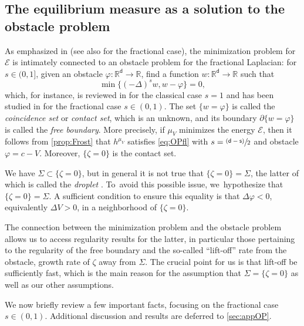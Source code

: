 \documentclass[10pt]{amsart}
\newcommand{\psfrac}[2]{\sfrac{(#1)}{#2}}
\theoremstyle{plain}
\theoremstyle{definition}
\newcommand{\R}{{\mathbb{R}}}
\newcommand{\Ec}{\mathcal{E}}
\let\D\Delta
\let\p\partial
\renewcommand{\d}{\mathsf{d}}
\newcommand{\s}{\mathsf{s}}
\begin{document}
\subsection{The equilibrium measure as a solution to the obstacle problem}\label{ssec:EMOPop}

As {emphasized} in \cite[\S 2.5]{Serfaty2015CGL} (see also \cite{PS2017,CDM2016} for the fractional case), the minimization problem for $\Ec$ is intimately connected to an obstacle problem for the fractional Laplacian: for $s\in (0,1]$, given an obstacle $\varphi:\R^\d\to\R$, find a function $w:\R^\d\to\R$ such that
\begin{equation}\label{eq:OPfl}
\min\{(-\D)^{s}w, w-\varphi\} = 0,
\end{equation}
which, for instance, is reviewed in \cite{Caffarelli1998} for the classical case $s=1$ and has been studied in \cite{Silvestre2007,ACS2008, CSS2008, KPS2015, DsS2016, BFRo2018, JN2017, KRS2019} for the fractional case $s \in (0,1)$. The set $\{w=\varphi\}$ is called the \emph{coincidence set} or \emph{contact set}, which is an unknown, and its boundary $\p\{w=\varphi\}$ is called the \emph{free boundary}. More precisely, if $\mu_V$ minimizes the energy $\Ec$, then it follows from \cref{prop:Frost} that $h^{\mu_V}$ satisfies \eqref{eq:OPfl} with $s = \psfrac{\d-\s}{2}$ and obstacle $\varphi = c-V$. Moreover, $\{\zeta=0\}$ is the contact set.

{We have $\Sigma \subset \{\zeta=0\}$}, but in general it is not true that $\{\zeta=0\} =\Sigma$, the latter of which is called the \emph{droplet} \cite{HM2013}. To~avoid this possible issue, we~hypothesize that $\{\zeta=0\}=\Sigma$. A sufficient condition to ensure this equality is that $\D\varphi <0$, equivalently $\D V>0$, in a neighborhood of $\{\zeta=0\}$.

The connection between the minimization problem and the obstacle problem allows us to access regularity results for the latter, in particular those pertaining to the regularity of the free boundary {and the so-called ``lift-off'' rate from the obstacle, \ie growth rate of $\zeta$ away from $\Sigma$. The crucial point for us is that lift-off be sufficiently fast, which is the main reason for the assumption that $\Sigma= \{\zeta=0\}$ as well as our other assumptions.}

We now briefly review a few important facts, focusing on the fractional case $s \in (0,1)$. Additional discussion and results are deferred to \cref{sec:appOP}.
\end{document}

